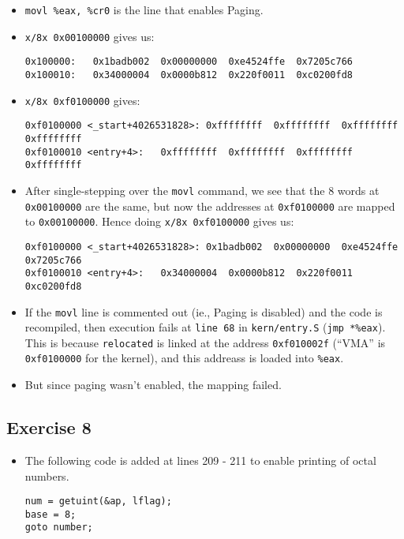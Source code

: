 \documentclass[]{article}
\begin{document}
\begin{itemize}
\item
  \texttt{movl \%eax, \%cr0} is the line that enables Paging.
\item
  \texttt{x/8x 0x00100000} gives us:

\begin{verbatim}
0x100000:   0x1badb002  0x00000000  0xe4524ffe  0x7205c766
0x100010:   0x34000004  0x0000b812  0x220f0011  0xc0200fd8
\end{verbatim}
\item
  \texttt{x/8x 0xf0100000} gives:

\begin{verbatim}
0xf0100000 <_start+4026531828>: 0xffffffff  0xffffffff  0xffffffff  0xffffffff
0xf0100010 <entry+4>:   0xffffffff  0xffffffff  0xffffffff  0xffffffff
\end{verbatim}
\item
  After single-stepping over the \texttt{movl} command, we see that the
  8 words at \texttt{0x00100000} are the same, but now the addresses at
  \texttt{0xf0100000} are mapped to \texttt{0x00100000}. Hence doing
  \texttt{x/8x 0xf0100000} gives us:

\begin{verbatim}
0xf0100000 <_start+4026531828>: 0x1badb002  0x00000000  0xe4524ffe  0x7205c766
0xf0100010 <entry+4>:   0x34000004  0x0000b812  0x220f0011  0xc0200fd8
\end{verbatim}
\item
  If the \texttt{movl} line is commented out (ie., Paging is disabled)
  and the code is recompiled, then execution fails at \texttt{line 68}
  in \texttt{kern/entry.S} (\texttt{jmp *\%eax}). This is because
  \texttt{relocated} is linked at the address \texttt{0xf010002f}
  (``VMA'' is \texttt{0xf0100000} for the kernel), and this addreass is
  loaded into \texttt{\%eax}.
\item
  But since paging wasn't enabled, the mapping failed.
\end{itemize}

\subsection{Exercise 8}

\begin{itemize}
\item
  The following code is added at lines 209 - 211 to enable printing of
  octal numbers.

\begin{verbatim}
num = getuint(&ap, lflag);
base = 8;
goto number;
\end{verbatim}
\end{itemize}
\end{document}
